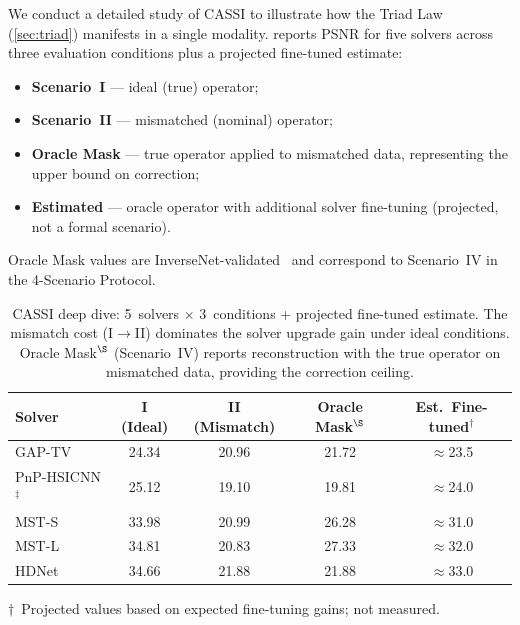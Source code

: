 We conduct a detailed study of CASSI to illustrate how the Triad Law (\cref{sec:triad}) manifests in
a single modality.   reports PSNR for five solvers
across three evaluation conditions plus a projected fine-tuned estimate:
%
\begin{itemize}
    \item \textbf{Scenario~I} --- ideal (true) operator;
    \item \textbf{Scenario~II} --- mismatched (nominal) operator;
    \item \textbf{Oracle Mask} --- true operator applied to
          mismatched data, representing the upper bound on correction;
    \item \textbf{Estimated} --- oracle operator with additional solver
          fine-tuning (projected, not a formal scenario).
\end{itemize}
%
\noindent Oracle Mask values are InverseNet-validated~\cite{yang2026inversenet} and correspond to Scenario~IV in the 4-Scenario Protocol.

\begin{table}[t]
\centering
\caption{CASSI deep dive: 5~solvers $\times$ 3~conditions + projected fine-tuned estimate.  The mismatch
cost (I$\to$II) dominates the solver upgrade gain under ideal conditions.  Oracle Mask$^\S$ (Scenario~IV) reports reconstruction with the true operator on mismatched data, providing the correction ceiling.}
\label{tab:cassi}
\smallskip
\begin{tabular}{@{}lcccc@{}}
\toprule
\textbf{Solver}
    & \textbf{I (Ideal)}
    & \textbf{II (Mismatch)}
    & \textbf{Oracle Mask$^\S$}
    & \textbf{Est.\ Fine-tuned}$^\dagger$ \\
\midrule
GAP-TV~\cite{yuan2016gaptv}   & 24.34 & 20.96 & 21.72 & ${\approx}$23.5 \\
PnP-HSICNN$^\ddagger$~\cite{wang2017adaptive} & 25.12 & 19.10 & 19.81 & ${\approx}$24.0 \\
MST-S~\cite{cai2022mst}     & 33.98 & 20.99 & 26.28 & ${\approx}$31.0 \\
MST-L~\cite{cai2022mst}     & 34.81 & 20.83 & 27.33 & ${\approx}$32.0 \\
HDNet~\cite{hu2022hdnet}     & 34.66 & 21.88 & 21.88 & ${\approx}$33.0 \\
\bottomrule
\end{tabular}
\end{table}

\smallskip
{\footnotesize $\dagger$~Projected values based on expected fine-tuning gains; not measured.}

